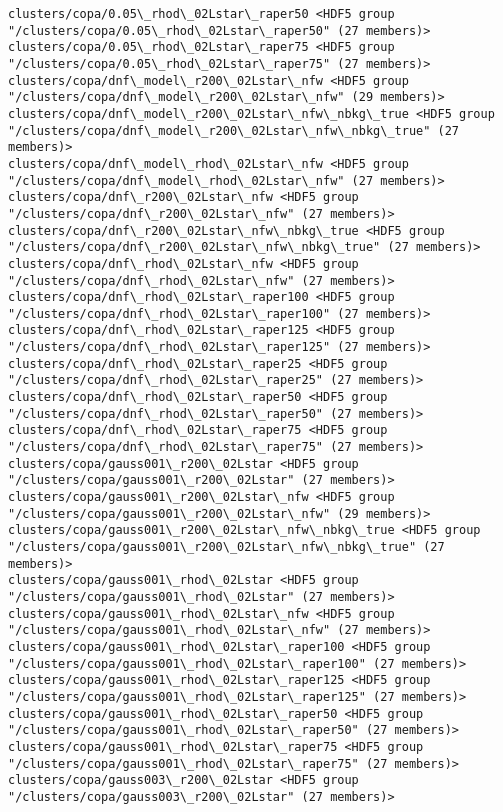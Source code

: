 \documentclass[11pt]{article}
\begin{document}
\begin{Verbatim}[commandchars=\\\{\}]
clusters/copa/0.05\_rhod\_02Lstar\_raper50 <HDF5 group "/clusters/copa/0.05\_rhod\_02Lstar\_raper50" (27 members)>
clusters/copa/0.05\_rhod\_02Lstar\_raper75 <HDF5 group "/clusters/copa/0.05\_rhod\_02Lstar\_raper75" (27 members)>
clusters/copa/dnf\_model\_r200\_02Lstar\_nfw <HDF5 group "/clusters/copa/dnf\_model\_r200\_02Lstar\_nfw" (29 members)>
clusters/copa/dnf\_model\_r200\_02Lstar\_nfw\_nbkg\_true <HDF5 group "/clusters/copa/dnf\_model\_r200\_02Lstar\_nfw\_nbkg\_true" (27 members)>
clusters/copa/dnf\_model\_rhod\_02Lstar\_nfw <HDF5 group "/clusters/copa/dnf\_model\_rhod\_02Lstar\_nfw" (27 members)>
clusters/copa/dnf\_r200\_02Lstar\_nfw <HDF5 group "/clusters/copa/dnf\_r200\_02Lstar\_nfw" (27 members)>
clusters/copa/dnf\_r200\_02Lstar\_nfw\_nbkg\_true <HDF5 group "/clusters/copa/dnf\_r200\_02Lstar\_nfw\_nbkg\_true" (27 members)>
clusters/copa/dnf\_rhod\_02Lstar\_nfw <HDF5 group "/clusters/copa/dnf\_rhod\_02Lstar\_nfw" (27 members)>
clusters/copa/dnf\_rhod\_02Lstar\_raper100 <HDF5 group "/clusters/copa/dnf\_rhod\_02Lstar\_raper100" (27 members)>
clusters/copa/dnf\_rhod\_02Lstar\_raper125 <HDF5 group "/clusters/copa/dnf\_rhod\_02Lstar\_raper125" (27 members)>
clusters/copa/dnf\_rhod\_02Lstar\_raper25 <HDF5 group "/clusters/copa/dnf\_rhod\_02Lstar\_raper25" (27 members)>
clusters/copa/dnf\_rhod\_02Lstar\_raper50 <HDF5 group "/clusters/copa/dnf\_rhod\_02Lstar\_raper50" (27 members)>
clusters/copa/dnf\_rhod\_02Lstar\_raper75 <HDF5 group "/clusters/copa/dnf\_rhod\_02Lstar\_raper75" (27 members)>
clusters/copa/gauss001\_r200\_02Lstar <HDF5 group "/clusters/copa/gauss001\_r200\_02Lstar" (27 members)>
clusters/copa/gauss001\_r200\_02Lstar\_nfw <HDF5 group "/clusters/copa/gauss001\_r200\_02Lstar\_nfw" (29 members)>
clusters/copa/gauss001\_r200\_02Lstar\_nfw\_nbkg\_true <HDF5 group "/clusters/copa/gauss001\_r200\_02Lstar\_nfw\_nbkg\_true" (27 members)>
clusters/copa/gauss001\_rhod\_02Lstar <HDF5 group "/clusters/copa/gauss001\_rhod\_02Lstar" (27 members)>
clusters/copa/gauss001\_rhod\_02Lstar\_nfw <HDF5 group "/clusters/copa/gauss001\_rhod\_02Lstar\_nfw" (27 members)>
clusters/copa/gauss001\_rhod\_02Lstar\_raper100 <HDF5 group "/clusters/copa/gauss001\_rhod\_02Lstar\_raper100" (27 members)>
clusters/copa/gauss001\_rhod\_02Lstar\_raper125 <HDF5 group "/clusters/copa/gauss001\_rhod\_02Lstar\_raper125" (27 members)>
clusters/copa/gauss001\_rhod\_02Lstar\_raper50 <HDF5 group "/clusters/copa/gauss001\_rhod\_02Lstar\_raper50" (27 members)>
clusters/copa/gauss001\_rhod\_02Lstar\_raper75 <HDF5 group "/clusters/copa/gauss001\_rhod\_02Lstar\_raper75" (27 members)>
clusters/copa/gauss003\_r200\_02Lstar <HDF5 group "/clusters/copa/gauss003\_r200\_02Lstar" (27 members)>

\end{Verbatim}
\end{document}
